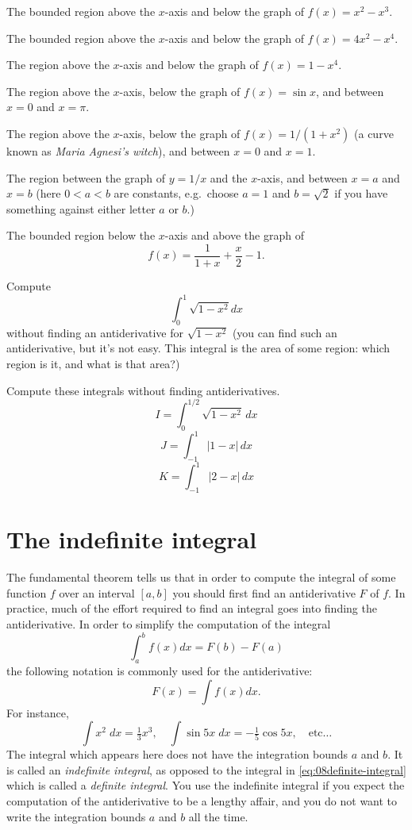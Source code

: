 \begin{multicols}{2}
\problem The bounded region above the $x$-axis and below the graph of $f(x) = x^2-x^3$.

\problem The bounded region above the $x$-axis and below the graph of $f(x) = 4x^2-x^4$.

\problem The region above the $x$-axis and below the graph of $f(x) = 1-x^4$.

\problem The region above the $x$-axis, below the graph of $f(x) = \sin x$, and
between $x=0$ and $x=\pi$.

\problem The region above the $x$-axis, below the graph of $f(x) = 1/(1+x^2)$ (a
curve known as \textit{Maria Agnesi's witch}), and between $x=0$ and
$x=1$.

\problem The region between the graph of $y=1/x$ and the $x$-axis, and between
$x=a$ and $x=b$ (here $0<a<b$ are constants, e.g.\ choose $a=1$ and $b=
\sqrt2$ if you have something against either letter $a$ or $b$.)

\problem The bounded region below the $x$-axis and above the graph of
\[
f(x) = \frac1{1+x} + \frac x2 -1.
\]

\problem Compute
\[
\int_0^{1}\sqrt{1-x^2} dx
\]
without finding an antiderivative for $\sqrt{1-x^2}$ (you can find such
an antiderivative, but it's not easy.  This integral is the area of
some region: which region is it, and what is that area?)

\problem \groupproblem Compute these integrals without finding antiderivatives.
\[
I = \int_0^{1/2}\sqrt{1-x^2}\,dx
\]
\[
J=\int_{-1}^1 |1-x|\,dx
\]
\[
K=\int_{-1}^1 |2-x|\,dx
\]



\end{multicols}
\noproblemfont

\section{The indefinite integral}
\label{sec:indefinite-integral}
The fundamental theorem tells us that in order to compute the integral
of some function $f$ over an interval $[a,b]$ you should first find an
antiderivative $F$ of $f$.  In practice, much of the effort required
to find an integral goes into finding the antiderivative.  In order to
simplify the computation of the integral
\begin{equation}
  \label{eq:08definite-integral}
  \int_a^b f(x) dx = F(b)-F(a)
\end{equation}
the following notation is commonly used for the antiderivative:
\begin{equation}
  \label{eq:08indefinite-integral}
  F(x) = \int f(x) d x .
\end{equation}
For instance,
\[
\int x^2 \;dx = \tfrac13x^3,\quad \int \sin 5x\; dx = -\tfrac15\cos 5x,
\quad\textrm{etc}\ldots
\]
The integral which appears here does not have the integration bounds
$a$ and $b$.  It is called an \emph{indefinite integral}, as opposed
to the integral in \eqref{eq:08definite-integral} which is called a
\emph{definite integral}.  You use the indefinite integral if you
expect the computation of the antiderivative to be a lengthy affair,
and you do not want to write the integration bounds $a$ and $b$ all
the time.


